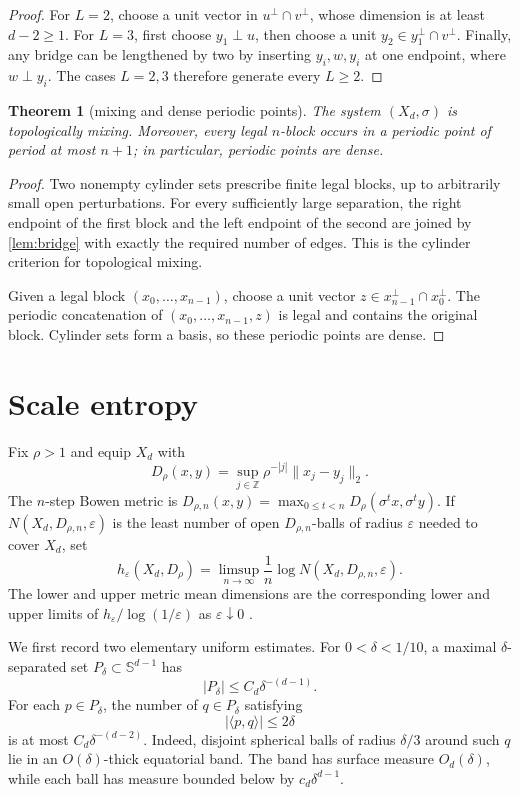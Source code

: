 \documentclass[11pt,a4paper]{amsart}
\newtheorem{theorem}{Theorem}[section]
\theoremstyle{definition}
\theoremstyle{remark}
\newcommand{\Sphere}{\mathbb S}
\newcommand{\Z}{\mathbb Z}
\begin{document}
\begin{proof}
For $L=2$, choose a unit vector in $u^\perp\cap v^\perp$, whose dimension is
at least $d-2\geq1$.  For $L=3$, first choose $y_1\perp u$, then choose a
unit $y_2\in y_1^\perp\cap v^\perp$.  Finally, any bridge can be lengthened
by two by inserting $y_i,w,y_i$ at one endpoint, where $w\perp y_i$.
The cases $L=2,3$ therefore generate every $L\geq2$.
\end{proof}

\begin{theorem}[mixing and dense periodic points]\label{thm:gluing}
The system $(X_d,\sigma)$ is topologically mixing.  Moreover, every legal
$n$-block occurs in a periodic point of period at most $n+1$; in particular,
periodic points are dense.
\end{theorem}

\begin{proof}
Two nonempty cylinder sets prescribe finite legal blocks, up to arbitrarily
small open perturbations.  For every sufficiently large separation, the
right endpoint of the first block and the left endpoint of the second are
joined by \cref{lem:bridge} with exactly the required number of edges.  This
is the cylinder criterion for topological mixing.

Given a legal block $(x_0,\ldots,x_{n-1})$, choose a unit vector
$z\in x_{n-1}^\perp\cap x_0^\perp$.  The periodic concatenation of
$(x_0,\ldots,x_{n-1},z)$ is legal and contains the original block.  Cylinder
sets form a basis, so these periodic points are dense.
\end{proof}

\section{Scale entropy}

Fix $\rho>1$ and equip $X_d$ with
\[
 D_\rho(x,y)=\sup_{j\in\Z}\rho^{-|j|}\|x_j-y_j\|_2.
\]
The $n$-step Bowen metric is
$D_{\rho,n}(x,y)=\max_{0\leq t<n}D_\rho(\sigma^tx,\sigma^ty)$.  If
$N(X_d,D_{\rho,n},\varepsilon)$ is the least number of open
$D_{\rho,n}$-balls of radius $\varepsilon$ needed to cover $X_d$, set
\[
 h_\varepsilon(X_d,D_\rho)
 =\limsup_{n\to\infty}\frac1n
   \log N(X_d,D_{\rho,n},\varepsilon).
\]
The lower and upper metric mean dimensions are the corresponding lower and
upper limits of $h_\varepsilon/\log(1/\varepsilon)$ as
$\varepsilon\downarrow0$ \cite{LindenstraussWeiss2000}.

We first record two elementary uniform estimates.  For $0<\delta<1/10$, a
maximal $\delta$-separated set $P_\delta\subset\Sphere^{d-1}$ has
\begin{equation}\label{eq:net-size}
 |P_\delta|\leq C_d\delta^{-(d-1)}.
\end{equation}
For each $p\in P_\delta$, the number of $q\in P_\delta$ satisfying
\begin{equation}\label{eq:band}
 |\langle p,q\rangle|\leq2\delta
\end{equation}
is at most $C_d\delta^{-(d-2)}$.  Indeed, disjoint spherical balls of radius
$\delta/3$ around such $q$ lie in an $O(\delta)$-thick equatorial band.  The
band has surface measure $O_d(\delta)$, while each ball has measure bounded
below by $c_d\delta^{d-1}$.
\end{document}
